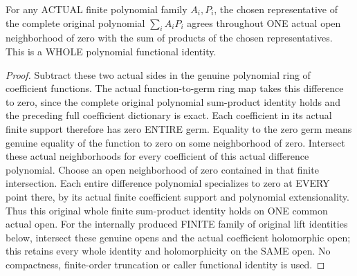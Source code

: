 \begin{lemma}
\label{hir:relative-normal-analytic-coefficients-finite-identity-spread}
\leanok
{}
For any ACTUAL finite polynomial family $A_i,P_i$, the chosen representative
of the complete original polynomial $\sum_i A_iP_i$ agrees throughout ONE
actual open neighborhood of zero with the sum of products of the chosen
representatives. This is a WHOLE polynomial functional identity.
\end{lemma}
\begin{proof}
Subtract these two actual sides in the genuine polynomial
ring of coefficient functions. The actual function-to-germ ring map takes
this difference to zero, since the complete original polynomial sum-product identity
holds and the preceding full coefficient dictionary is exact.
Each coefficient in its actual finite support therefore has zero ENTIRE
germ. Equality to the zero germ means genuine equality of the function to
zero on some neighborhood of zero. Intersect these actual neighborhoods
for every coefficient of this actual difference polynomial. Choose an open
neighborhood of zero contained in that finite intersection. Each entire
difference polynomial specializes to zero at EVERY point there, by its
actual finite coefficient support and polynomial extensionality. Thus this
original whole finite sum-product identity holds on ONE common actual open.
For the internally produced FINITE family of original lift identities below,
intersect these genuine opens and the actual coefficient holomorphic open;
this retains every whole identity and holomorphicity on the SAME open. No
compactness, finite-order truncation or caller functional identity is used.
\end{proof}

